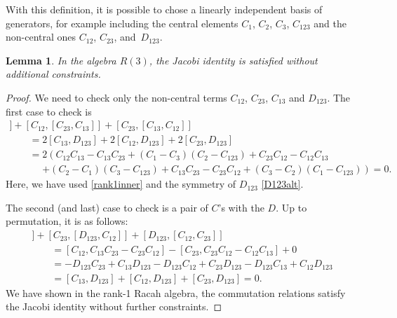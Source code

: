 \documentclass[10pt,a4paper]{amsart}
\numberwithin{equation}{section}
\newtheorem{Lemma}[Theorem]{Lemma}
\begin{document}
With this definition, it is possible to chose a linearly independent basis of generators, for example including the central elements $C_1$, $C_2$, $C_3$, $C_{123}$ and the non-central ones $C_{12}$, $C_{23}$, and~$D_{123}$.

\begin{Lemma}\label{JacobiRank1}
In the algebra $R(3)$, the Jacobi identity is satisfied without additional constraints.
\end{Lemma}
\begin{proof}
 We need to check only the non-central terms $C_{12}$, $ C_{23}$, $C_{13}$ and $D_{123}$. The first case to check is
\begin{gather*}
[C_{13},[C_{12}, C_{23}]]+ [C_{12},[C_{23}, C_{13}]]+[C_{23},[C_{13}, C_{12}]]\\
\qquad= 2 [C_{13}, D_{123}]+2[C_{12}, D_{123}]+2[C_{23}, D_{123}]\\
\qquad= 2 \left( C_{12}C_{13}-C_{13}C_{23}+(C_1-C_3)(C_2-C_{123}) + C_{23}C_{12}-C_{12}C_{13}\right.\\
\phantom{=}{}\qquad\left.+(C_2-C_1)(C_3-C_{123}) +C_{13}C_{23}-C_{23}C_{12}+(C_3-C_2)(C_1-C_{123})\right) = 0.
\end{gather*}
Here, we have used \eqref{rank1inner} and the symmetry of $D_{123}$ \eqref{D123alt}.

The second (and last) case to check is a pair of $C$'s with the $D$. Up to permutation, it is as follows:
\begin{gather*}
[C_{12},[C_{23}, D_{123}]]+ [C_{23},[D_{123}, C_{12}]]+[D_{123},[C_{12}, C_{23}]]\\
\qquad= [ C_{12},C_{13}C_{23}-C_{23}C_{12}]- [C_{23}, C_{23}C_{12}-C_{12}C_{13}]+0\\
\qquad= -D_{123}C_{23}+C_{13}D_{123}- D_{123} C_{12} +C_{23}D_{123} -D_{123} C_{13}+C_{12}D_{123}  \\
\qquad= [C_{13}, D_{123}]+[C_{12}, D_{123}]+[C_{23}, D_{123}] =0.
\end{gather*}
We have shown in the rank-1 Racah algebra, the commutation relations satisfy the Jacobi identity without further constraints.
\end{proof}
\end{document}
